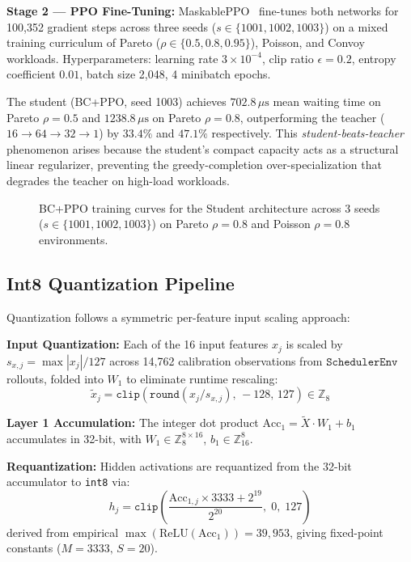 \textbf{Stage 2 --- PPO Fine-Tuning:} MaskablePPO~\cite{Huang2022} fine-tunes
both networks for 100{,}352 gradient steps across three seeds
($s \in \{1001, 1002, 1003\}$) on a mixed training curriculum of Pareto
($\rho \in \{0.5, 0.8, 0.95\}$), Poisson, and Convoy workloads.
Hyperparameters: learning rate $3 \times 10^{-4}$, clip ratio $\epsilon = 0.2$,
entropy coefficient $0.01$, batch size 2{,}048, 4 minibatch epochs.

The student (BC+PPO, seed 1003) achieves $702.8\,\mu\text{s}$ mean waiting
time on Pareto $\rho = 0.5$ and $1238.8\,\mu\text{s}$ on Pareto $\rho = 0.8$,
outperforming the teacher ($16\to 64\to 32\to 1$) by $33.4\%$ and
$47.1\%$ respectively. This \emph{student-beats-teacher} phenomenon arises
because the student's compact capacity acts as a structural linear regularizer,
preventing the greedy-completion over-specialization that degrades the teacher
on high-load workloads.

\begin{figure}[t]
  \centering
  \caption{BC+PPO training curves for the Student architecture across 3 seeds ($s \in \{1001, 1002, 1003\}$) on Pareto $\rho = 0.8$ and Poisson $\rho = 0.8$ environments.}
  \label{fig:learning_curves}
\end{figure}

\subsection{Int8 Quantization Pipeline}
\label{subsec:quant}

Quantization follows a symmetric per-feature input scaling approach:

\textbf{Input Quantization:} Each of the 16 input features $x_j$ is scaled by
$s_{x,j} = \max|x_j| / 127$ across 14{,}762 calibration observations from
$\texttt{SchedulerEnv}$ rollouts, folded into $W_1$ to eliminate runtime
rescaling:
\begin{equation}
  \tilde{x}_{j} = \texttt{clip}\!\left(\texttt{round}(x_j / s_{x,j}),\,-128,\,127\right) \in \mathbb{Z}_8
\end{equation}

\textbf{Layer 1 Accumulation:} The integer dot product
$\text{Acc}_1 = \tilde{X} \cdot W_1 + b_1$ accumulates in 32-bit, with
$W_1 \in \mathbb{Z}_8^{8\times16}$, $b_1 \in \mathbb{Z}_{16}^8$.

\textbf{Requantization:} Hidden activations are requantized from the 32-bit
accumulator to \texttt{int8} via:
\begin{equation}
  h_j = \texttt{clip}\!\left(\frac{\text{Acc}_{1,j} \times 3333 + 2^{19}}{2^{20}},\;0,\;127\right)
  \label{eq:requant}
\end{equation}
derived from empirical $\max(\text{ReLU}(\text{Acc}_1)) = 39{,}953$, giving
fixed-point constants ($M = 3333,\,S = 20$).

